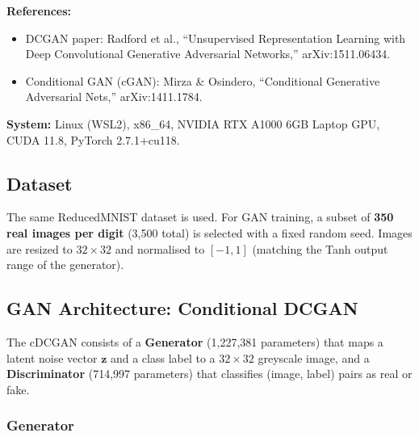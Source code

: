 \documentclass[12pt, a4paper]{article}
\begin{document}
\textbf{References:}
\begin{itemize}
    \item DCGAN paper: Radford et al., ``Unsupervised Representation Learning with Deep
          Convolutional Generative Adversarial Networks,'' arXiv:1511.06434.
    \item Conditional GAN (cGAN): Mirza \& Osindero, ``Conditional Generative Adversarial
          Nets,'' arXiv:1411.1784.
\end{itemize}

\textbf{System:} Linux (WSL2), x86\_64, NVIDIA RTX A1000 6GB Laptop GPU, CUDA 11.8,
PyTorch 2.7.1+cu118.

\subsection{Dataset}

The same ReducedMNIST dataset is used. For GAN training, a subset of \textbf{350 real
images per digit} (3{,}500 total) is selected with a fixed random seed. Images are
resized to $32 \times 32$ and normalised to $[-1, 1]$ (matching the Tanh output range
of the generator).

\subsection{GAN Architecture: Conditional DCGAN}

The cDCGAN consists of a \textbf{Generator} (1{,}227{,}381 parameters) that maps a
latent noise vector $\mathbf{z}$ and a class label to a $32 \times 32$ greyscale image,
and a \textbf{Discriminator} (714{,}997 parameters) that classifies (image, label) pairs
as real or fake.

\subsubsection{Generator}
\end{document}
